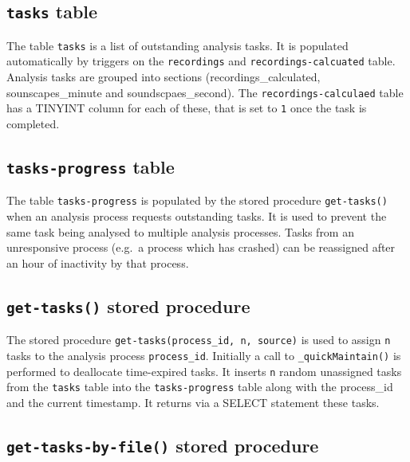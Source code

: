 \documentclass[
]{book}
\begin{document}
\hypertarget{tasks-table}{%
\subsection{\texorpdfstring{\texttt{tasks} table}{tasks table}}\label{tasks-table}}

The table \texttt{tasks} is a list of outstanding analysis tasks. It is populated automatically by triggers on the \texttt{recordings} and \texttt{recordings-calcuated} table. Analysis tasks are grouped into sections (recordings\_calculated, sounscapes\_minute and soundscpaes\_second). The \texttt{recordings-calculaed} table has a TINYINT column for each of these, that is set to \texttt{1} once the task is completed.

\hypertarget{tasks-progress-table}{%
\subsection{\texorpdfstring{\texttt{tasks-progress} table}{tasks-progress table}}\label{tasks-progress-table}}

The table \texttt{tasks-progress} is populated by the stored procedure \texttt{get-tasks()} when an analysis process requests outstanding tasks. It is used to prevent the same task being analysed to multiple analysis processes. Tasks from an unresponsive process (e.g.~a process which has crashed) can be reassigned after an hour of inactivity by that process.

\hypertarget{get-tasks-stored-procedure}{%
\subsection{\texorpdfstring{\texttt{get-tasks()} stored procedure}{get-tasks() stored procedure}}\label{get-tasks-stored-procedure}}

The stored procedure \texttt{get-tasks(process\_id,\ n,\ source)} is used to assign \texttt{n} tasks to the analysis process \texttt{process\_id}. Initially a call to \texttt{\_quickMaintain()} is performed to deallocate time-expired tasks. It inserts \texttt{n} random unassigned tasks from the \texttt{tasks} table into the \texttt{tasks-progress} table along with the process\_id and the current timestamp. It returns via a SELECT statement these tasks.

\hypertarget{get-tasks-by-file-stored-procedure}{%
\subsection{\texorpdfstring{\texttt{get-tasks-by-file()} stored procedure}{get-tasks-by-file() stored procedure}}\label{get-tasks-by-file-stored-procedure}}
\end{document}

